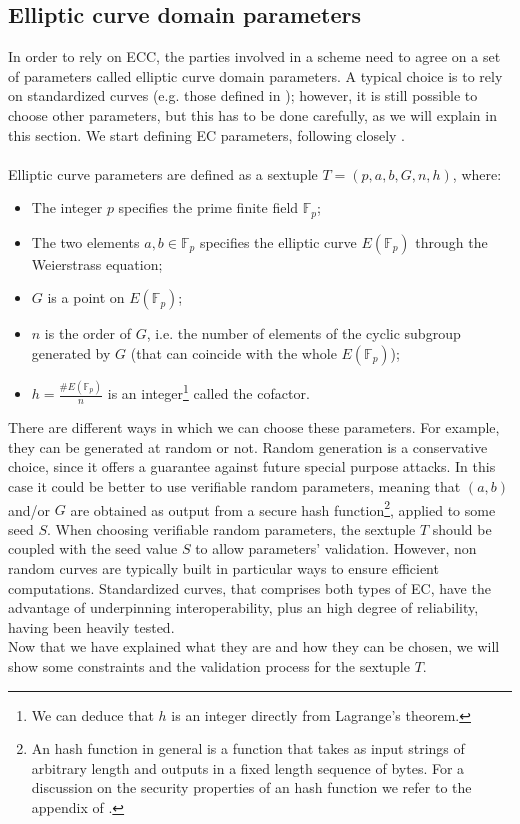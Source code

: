 \bigskip

\subsection{Elliptic curve domain parameters}
\label{ecparam}
In order to rely on ECC, the parties involved in a scheme need to agree on a set of parameters called elliptic curve domain parameters. A typical choice is to rely on standardized curves (e.g. those defined in \cite{RefWork:3}); however, it is still possible to choose other parameters, but this has to be done carefully, as we will explain in this section. We start defining EC parameters, following closely \cite{RefWork:2}.
\\
\\
Elliptic curve parameters are defined as a sextuple $T = (p, a, b, G, n, h)$, where:
\begin{itemize}
	\item The integer $p$ specifies the prime finite field $\mathbb{F}_p$;
	\item The two elements $a, b \in \mathbb{F}_p$ specifies the elliptic curve $E(\mathbb{F}_p)$ through the Weierstrass equation;
	\item $G$ is a point on $E(\mathbb{F}_p)$;
	\item $n$ is the order of $G$, i.e. the number of elements of the cyclic subgroup generated by $G$ (that can coincide with the whole $E(\mathbb{F}_p)$);
	\item $h = \frac{\#E(\mathbb{F}_p)}{n}$ is an integer\footnote{We can deduce that $h$ is an integer directly from Lagrange's theorem.} called the cofactor. 
\end{itemize}
There are different ways in which we can choose these parameters. For example, they can be generated at random or not. Random generation is a conservative choice, since it offers a guarantee against future special purpose attacks. In this case it could be better to use verifiable random parameters, meaning that $(a, b)$ and/or $G$ are obtained as output from a secure hash function\footnote{An hash function in general is a function that takes as input strings of arbitrary length and outputs in a fixed length sequence of bytes. For a discussion on the security properties of an hash function we refer to the appendix of \cite{RefWork:2}.}, applied to some seed $S$. When choosing verifiable random parameters, the sextuple $T$ should be coupled with the seed value $S$ to allow parameters' validation. However, non random curves are typically built in particular ways to ensure efficient computations. Standardized curves, that comprises both types of EC, have the advantage of underpinning interoperability, plus an high degree of reliability, having been heavily tested.
\\
Now that we have explained what they are and how they can be chosen, we will show some constraints and the validation process for the sextuple $T$.

